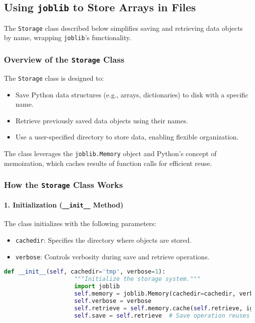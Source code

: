 \documentclass{article}
\begin{document}
	
	
		\subsection{Using \texttt{joblib} to Store Arrays in Files}
		
			The \texttt{Storage} class described below simplifies saving and retrieving data objects by name, wrapping \texttt{joblib}'s functionality.
			
			\subsubsection{Overview of the \texttt{Storage} Class}
			
			The \texttt{Storage} class is designed to:
			\begin{itemize}
				\item Save Python data structures (e.g., arrays, dictionaries) to disk with a specific name.
				\item Retrieve previously saved data objects using their names.
				\item Use a user-specified directory to store data, enabling flexible organization.
			\end{itemize}
			
			The class leverages the \texttt{joblib.Memory} object and Python's concept of memoization, which caches results of function calls for efficient reuse.
			
			\subsubsection{How the \texttt{Storage} Class Works}
			
			\paragraph{1. Initialization (\texttt{\_\_init\_\_} Method)}  
			The class initializes with the following parameters:
			\begin{itemize}
				\item \texttt{cachedir}: Specifies the directory where objects are stored.
				\item \texttt{verbose}: Controls verbosity during save and retrieve operations.
			\end{itemize}
			
			\begin{lstlisting}[language=Python]
				def __init__(self, cachedir='tmp', verbose=1):
					"""Initialize the storage system."""
					import joblib
					self.memory = joblib.Memory(cachedir=cachedir, verbose=verbose)  # Set up caching
					self.verbose = verbose
					self.retrieve = self.memory.cache(self.retrieve, ignore=['data'])  # Caching logic
					self.save = self.retrieve  # Save operation reuses retrieve logic
			\end{lstlisting}
			
\end{document}
